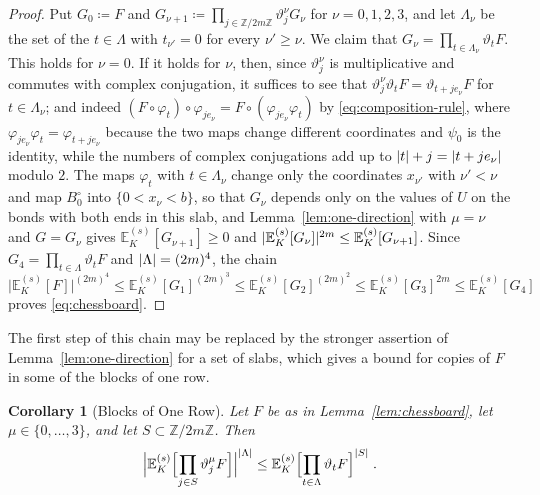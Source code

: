 \documentclass[11pt]{preprint}
\DeclarePairedDelimiter{\abs}{\lvert}{\rvert}
\numberwithin{equation}{section}
\newtheorem{corollary}[theorem]{Corollary}
\theoremstyle{definition}
\theoremstyle{remark}
\theoremstyle{plain}
\begin{document}
\begin{proof}
Put $G_0 \coloneqq F$ and $G_{\nu+1} \coloneqq \prod_{j \in \mathbb Z/2m\mathbb Z}\vartheta^\nu_jG_\nu$ for $\nu = 0, 1, 2, 3$, and let $\Lambda_\nu$ be the set of the $t \in \Lambda$ with $t_{\nu'} = 0$ for every $\nu' \geq \nu$. We claim that $G_\nu = \prod_{t \in \Lambda_\nu}\vartheta_tF$. This holds for $\nu = 0$. If it holds for $\nu$, then, since $\vartheta^\nu_j$ is multiplicative and commutes with complex conjugation, it suffices to see that $\vartheta^\nu_j\vartheta_tF = \vartheta_{t+je_\nu}F$ for $t \in \Lambda_\nu$; and indeed $(F \circ \varphi_t) \circ \varphi_{je_\nu} = F \circ (\varphi_{je_\nu}\varphi_t)$ by \eqref{eq:composition-rule}, where $\varphi_{je_\nu}\varphi_t = \varphi_{t+je_\nu}$ because the two maps change different coordinates and $\psi_0$ is the identity, while the numbers of complex conjugations add up to $\abs{t} + j = \abs{t + je_\nu}$ modulo $2$. The maps $\varphi_t$ with $t \in \Lambda_\nu$ change only the coordinates $x_{\nu'}$ with $\nu' < \nu$ and map $B^\circ_0$ into $\{ 0 < x_\nu < b \}$, so that $G_\nu$ depends only on the values of $U$ on the bonds with both ends in this slab, and Lemma~\ref{lem:one-direction} with $\mu = \nu$ and $G = G_\nu$ gives $\mathbb E^{(s)}_K[G_{\nu+1}] \geq 0$ and $\abs{\mathbb E^{(s)}_K[G_\nu]}^{2m} \leq \mathbb E^{(s)}_K[G_{\nu+1}]$. Since $G_4 = \prod_{t \in \Lambda}\vartheta_tF$ and $\abs{\Lambda} = (2m)^4$, the chain
\begin{equation}\label{eq:chessboard-chain}
    \bigl\lvert\mathbb E^{(s)}_K[F]\bigr\rvert^{(2m)^4} \leq \mathbb E^{(s)}_K[G_1]^{(2m)^3} \leq \mathbb E^{(s)}_K[G_2]^{(2m)^2} \leq \mathbb E^{(s)}_K[G_3]^{2m} \leq \mathbb E^{(s)}_K[G_4]
\end{equation}
proves \eqref{eq:chessboard}.
\end{proof}

The first step of this chain may be replaced by the stronger assertion of Lemma~\ref{lem:one-direction} for a set of slabs, which gives a bound for copies of $F$ in some of the blocks of one row.

\begin{corollary}[Blocks of One Row]\label{cor:one-row}
Let $F$ be as in Lemma~\ref{lem:chessboard}, let $\mu \in \{ 0, \dots, 3 \}$, and let $S \subset \mathbb Z/2m\mathbb Z$. Then
\begin{equation}\label{eq:one-row}
    \Bigl\lvert\mathbb E^{(s)}_K\Bigl[\prod_{j \in S}\vartheta^\mu_jF\Bigr]\Bigr\rvert^{\abs{\Lambda}} \leq \mathbb E^{(s)}_K\Bigl[\prod_{t \in \Lambda}\vartheta_tF\Bigr]^{\abs{S}}\;.
\end{equation}
\end{corollary}
\end{document}
